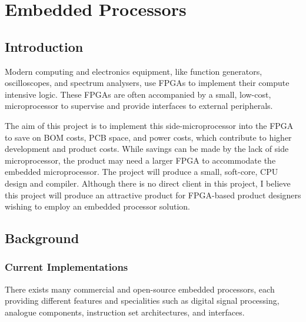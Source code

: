 \documentclass[11pt,a4paper]{report}
\begin{document}
\newpage
\chapter{Embedded Processors}
{\hypersetup{linkcolor=black}
\startcontents[chapters]
}

\section{Introduction}
Modern computing and electronics equipment, like function generators, oscilloscopes, and spectrum analysers, use FPGAs to implement their compute intensive logic. These FPGAs are often accompanied by a small, low-cost, microprocessor to supervise and provide interfaces to external peripherals.

The aim of this project is to implement this side-microprocessor into the FPGA to save on BOM costs, PCB  space,  and  power  costs,  which  contribute  to  higher  development  and  product  costs.  While  savings can  be  made  by  the  lack  of  side  microprocessor,  the  product  may  need  a  larger  FPGA  to  accommodate the embedded microprocessor.  The project will produce a small, soft-core, CPU design and compiler. Although there is no direct client in this project, I believe this project will produce an attractive product
for FPGA-based product designers wishing to employ an embedded processor solution.


\section{Background}
\subsection{Current Implementations}
There exists many commercial and open-source embedded processors, each providing different features and specialities such as digital signal processing, analogue components, instruction set architectures, and interfaces.
\end{document}
